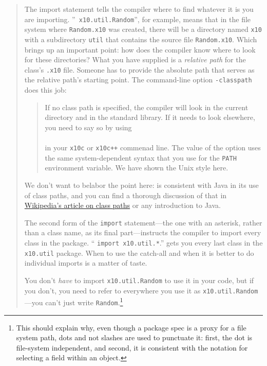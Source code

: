 \begin{quote}
The import
statement tells the compiler where to find whatever it is you are importing.  ''{\tt
x10.}{\tt util.}{\tt Ran\-dom}'', for example, means that in the file system
where {\tt Random.x10} was created, there will be a directory named {\tt x10}
with a subdirectory {\tt util} that contains the source file {\tt Random.x10}.
Which brings up an important point: how does the compiler know where to look
for these directories?   What you have supplied is a {\em relative path}
for the class's {\tt .x10} file.  
Someone has to provide the absolute path that serves as the relative
path's starting point.
The command-line option {\tt -classpath} does this job:
\begin{quote}
  If
no class path is specified, the compiler will look in the current directory
and in the \Xten{} standard library.  If it needs to look elsewhere, you need
to say so by using \\
\hspace*{3em}{\tt -classpath path1;path2;...}\\
in your {\tt x10c} or {\tt x10c++} commenad line.  The value of the
option uses the same system-dependent syntax that you use for the
{\tt PATH} environment variable.  We have shown the Unix style here.
\end{quote}
We don't want to belabor the point here: \Xten{} is consistent with
Java in its use of class paths, and you can find a thorough
discussion of that in 
\href{http://en.wikipedia.org/wiki/Classpath_%28Java%29}
{Wikipedia's article on class paths} or any introduction to Java.

The second form of the {\tt import} statement---the one with an asterisk,
rather than a class name, as its final
part---instructs the compiler to import every class in the package.
`` {\tt import x10.util.*}.'' gets you every last class in the {\tt x10.util}
package.
When to use the catch-all and when it is better to do individual imports is a
matter of taste.

You don't {\em have} to import {\tt x10.util.Random} to use it in your code,
but if you don't, you need to refer to everywhere you use it as
{\tt x10.util.Ran\-dom}---you can't just write {\tt Random}.\footnote{This
should explain why, even though a package spec is a proxy for a file system path, dots and not
slashes are used to punctuate it: first, the dot is file-system independent, and
second, it is consistent with the notation for selecting a field within an object.}


\end{quote}

